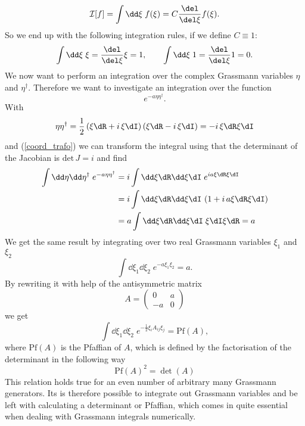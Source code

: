 \begin{equation}
\mathcal{I}[f]=\int \dd\xi\; f(\xi) = C\frac{\del }{\del\xi}f(\xi).
\end{equation}
So we end up with the following integration rules, if we define $C\equiv 1$:
\begin{equation}
\int \dd\xi\; \xi = \frac{\del }{\del\xi}\xi =1,\qquad \int \dd\xi\; 1 = \frac{\del }{\del\xi}1 =0.
\end{equation}
We now want to perform an integration over the complex Grassmann variables $\eta$ and $\eta^{\dagger}$. Therefore we want to investigate an integration over the function
\begin{equation}
e ^{-a\eta\eta^{\dagger}}.
\end{equation}
With
\begin{equation}
\eta\eta^{\dagger} = \frac{1}{2}\left(\xi\dR+i\,\xi\dI\right)\left(\xi\dR-i\, \xi\dI\right) = -i\,\xi\dR\xi\dI
\end{equation}
and (\ref{coord_trafo}) we can transform the integral using that the determinant of the Jacobian is $\mathrm{det}\,J=i$ and find
\begin{align}
\int \dd\eta\dd\eta^{\dagger}\;e ^{-a\eta\eta^{\dagger}} &= i\int \dd\xi\dR \dd\xi\dI\; e ^{ia\xi\dR\xi\dI}\notag \\
%
%
&=i\int\dd\xi\dR\dd\xi\dI\, \left( 1+ i\,a\xi\dR\xi\dI \right) \\
%
%
&=a \int\dd\xi\dR\dd\xi\dI \;\xi\dI\xi\dR = a \notag
\end{align}
We get the same result by integrating over two real Grassmann variables $\xi_{1}$ and $\xi_{2}$
\begin{equation}
\int \dd\xi_{1}\dd\xi_{2}\; e ^{-a\xi_{1}\xi_{2}}=a.
\end{equation}
By rewriting it with help of the antisymmetric matrix
\begin{equation}
A=\left(\begin{array}{cc}
0 & a \\
-a & 0
\end{array} \right)
\end{equation}
we get
\begin{equation}
\int \dd\xi_{1}\dd\xi_{2}\; e ^{-\frac{1}{2}\xi_{i}A_{ij}\xi_{j}} = \mathrm{Pf}\left(A\right),
\end{equation}
where $\mathrm{Pf}\left(A\right)$ is the Pfaffian of $A$, which is defined by the factorisation of the determinant in the following way
%
%
\begin{equation}
\mathrm{Pf}\left(A\right)^{2} = \det(A)
\end{equation}
This relation holds true for an even number of arbitrary many Grassmann generators. Its is therefore possible to integrate out Grassmann variables and be left with calculating a determinant or Pfaffian, which comes in quite essential when dealing with Grassmann integrals numerically.\\[2cm]
%
%
%
%
%
%
%
%
